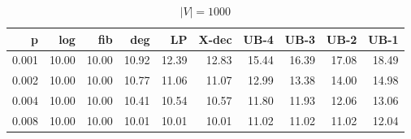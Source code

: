 \begin{table}[]
\centering
\begin{tabular}{rrrrrrrrrr}
p     & log  & fib  & deg  & LP    & X-dec & UB-4  & UB-3  & UB-2  & UB-1  \\
\hline
0.001 & 10.00 & 10.00 & 10.92 & 12.39 & 12.83 & 15.44 & 16.39 & 17.08 & 18.49 \\
0.002 & 10.00 & 10.00 & 10.77 & 11.06 & 11.07 & 12.99 & 13.38 & 14.00 & 14.98 \\
0.004 & 10.00 & 10.00 & 10.41 & 10.54 & 10.57 & 11.80 & 11.93 & 12.06 & 13.06 \\
0.008 & 10.00 & 10.00 & 10.01 & 10.01 & 10.01 & 11.02 & 11.02 & 11.02 & 12.04
\end{tabular}
\caption{$|V|=1000$}
\label{tab:lbup1000}
\end{table}


